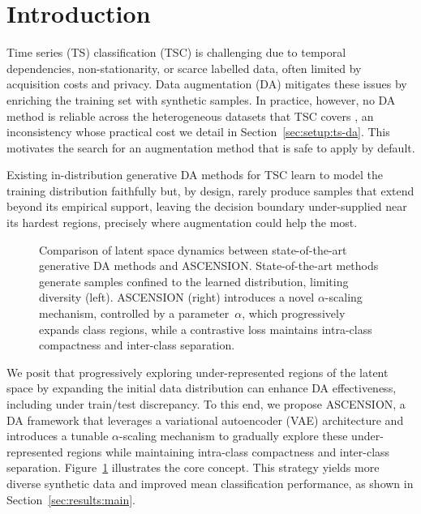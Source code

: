 \section{Introduction}
\label{sec:intro}

Time series (TS) classification (TSC) is challenging due to temporal
dependencies, non-stationarity, or scarce labelled data, often
limited by acquisition costs and privacy. Data augmentation (DA)
mitigates these issues by enriching the training set with
synthetic samples.
In practice, however, no DA method is reliable across the
heterogeneous datasets that TSC covers
\citep{iwana2021empirical, iglesias2023data}, an inconsistency
whose practical cost we detail in
Section~\ref{sec:setup:ts-da}. This motivates the search for an
augmentation method that is safe to apply by default.

Existing in-distribution generative DA methods for TSC learn to model the training distribution
faithfully but, by design, rarely produce samples that extend
beyond its empirical support, leaving the decision boundary
under-supplied near its hardest regions, precisely where
augmentation could help the most.
\begin{figure}[t]
    \centering
    
\caption{Comparison of latent space dynamics between
state-of-the-art generative DA methods and ASCENSION.
State-of-the-art methods generate samples confined to the
learned distribution, limiting diversity (left). ASCENSION
(right) introduces a novel $\alpha$-scaling mechanism,
controlled by a parameter~$\alpha$, which progressively expands
class regions, while a contrastive loss maintains intra-class
compactness and inter-class separation.}
    \label{fig:SoTaVSASCENSION}
\end{figure}

We posit that progressively exploring under-represented regions
of the latent space by expanding the initial data distribution
can enhance DA effectiveness, including under train/test
discrepancy. To this end, we propose ASCENSION, a DA framework
that leverages a variational autoencoder (VAE) architecture and
introduces a tunable $\alpha$-scaling mechanism to gradually
explore these under-represented regions while maintaining
intra-class compactness and inter-class separation.
Figure~\ref{fig:SoTaVSASCENSION} illustrates the core concept.
This strategy yields more diverse synthetic data and improved
mean classification performance, as shown in
Section~\ref{sec:results:main}.

